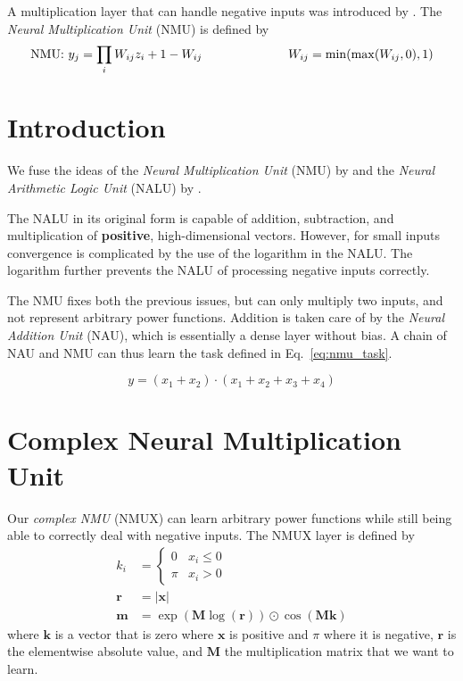 \documentclass[9pt]{article}
\begin{document}
A multiplication layer that can handle negative inputs was introduced by \citet{madsen_neural_2020}.
The \emph{Neural Multiplication Unit} (NMU) is defined by
\begin{align}
  \text{NMU: } y_j = \prod_i W_{ij} z_{i} + 1 - W_{ij} \hskip .2\textwidth W_{ij}=\min(\max(W_{ij}, 0), 1)
\end{align}



\section{Introduction}%
\label{sec:introduction}

We fuse the ideas of the \emph{Neural Multiplication Unit} (NMU) by
\citet{madsen_neural_2020} and the \emph{Neural Arithmetic Logic Unit} (NALU)
by \citet{trask_neural_2018}.

The NALU in its original form is capable of addition, subtraction, and
multiplication of \textbf{positive}, high-dimensional vectors. However, for
small inputs convergence is complicated by the use of the logarithm in the
NALU. The logarithm further prevents the NALU of processing negative inputs
correctly.

The NMU fixes both the previous issues, but can only multiply two inputs, and
not represent arbitrary power functions.  Addition is taken care of by the
\emph{Neural Addition Unit} (NAU), which is essentially a dense layer without
bias. A chain of NAU and NMU can thus learn the task defined in
Eq.~\ref{eq:nmu_task}.

\begin{equation}
  \label{eq:nmu_task}
  y = (x_1 + x_2) \cdot (x_1 + x_2 + x_3 + x_4)
\end{equation}


\section{Complex Neural Multiplication Unit}%
\label{sec:complex_neural_multiplication_unit}

Our \emph{complex NMU} (NMUX) can learn arbitrary power functions while still
being able to correctly deal with negative inputs.
The NMUX layer is defined by
\begin{align}
  k_i &= \begin{cases}
     0  & x_i \leq 0 \\
    \pi & x_i > 0
  \end{cases} \\
  \bm r &= |\bm x| \\
  \bm m &= \exp(\bm M \log(\bm r)) \odot \cos(\bm M \bm k)
\end{align}
where $\bm k$ is a vector that is zero where $\bm x$ is positive and $\pi$
where it is negative, $\bm r$ is the elementwise absolute value, and $\bm M$
the multiplication matrix that we want to learn.
\end{document}
